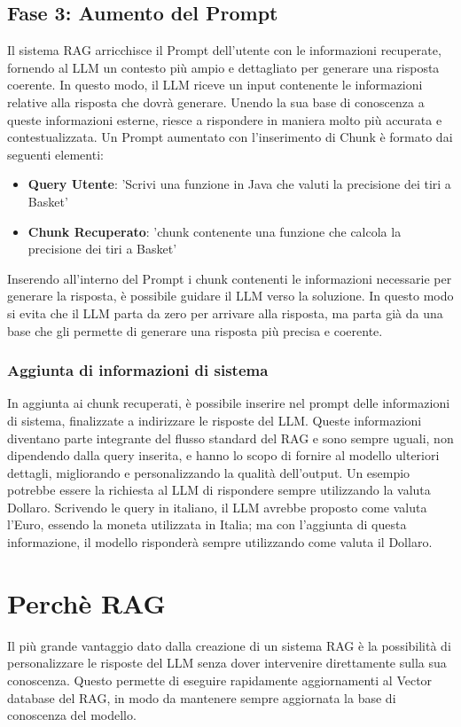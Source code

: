 \documentclass[12pt,a4paper,openright,twoside]{book}
\begin{document}
\subsection{Fase 3: Aumento del Prompt}
Il sistema \ac{RAG} arricchisce il Prompt dell'utente con le informazioni recuperate, fornendo al \ac{LLM} un contesto più ampio e dettagliato per generare una risposta coerente. In questo modo, il \ac{LLM} riceve un input contenente le informazioni relative alla risposta che dovrà generare. Unendo la sua base di conoscenza a queste informazioni esterne, riesce a rispondere in maniera molto più accurata e contestualizzata. Un Prompt aumentato con l'inserimento di Chunk è formato dai seguenti elementi:
\begin{itemize}
    \item \textbf{Query Utente}: 'Scrivi una funzione in Java che valuti la precisione dei tiri a Basket'
    \item \textbf{Chunk Recuperato}: 'chunk contenente una funzione che calcola la precisione dei tiri a Basket'
\end{itemize}
Inserendo all'interno del Prompt i chunk contenenti le informazioni necessarie per generare la risposta, è possibile guidare il LLM verso la soluzione. In questo modo si evita che il LLM parta da zero per arrivare alla risposta, ma parta già da una base che gli permette di generare una risposta più precisa e coerente.

\subsubsection{Aggiunta di informazioni di sistema}
In aggiunta ai chunk recuperati, è possibile inserire nel prompt delle informazioni di sistema, finalizzate a indirizzare le risposte del \ac{LLM}. Queste informazioni diventano parte integrante del flusso standard del RAG e sono sempre uguali, non dipendendo dalla query inserita, e hanno lo scopo di fornire al modello ulteriori dettagli, migliorando e personalizzando la qualità dell'output. Un esempio potrebbe essere la richiesta al \ac{LLM} di rispondere sempre utilizzando la valuta Dollaro. Scrivendo le query in italiano, il \ac{LLM} avrebbe proposto come valuta l'Euro, essendo la moneta utilizzata in Italia; ma con l'aggiunta di questa informazione, il modello risponderà sempre utilizzando come valuta il Dollaro.
\section{Perchè RAG}
Il più grande vantaggio dato dalla creazione di un sistema RAG è la possibilità di personalizzare le risposte del \ac{LLM} senza dover intervenire direttamente sulla sua conoscenza.
Questo permette di eseguire rapidamente aggiornamenti al Vector database del \ac{RAG}, in modo da mantenere sempre aggiornata la base di conoscenza del modello.
\end{document}
